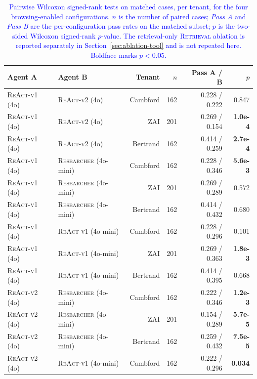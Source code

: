 \begin{table}[htbp]
\centering
\footnotesize
\caption{\textcolor{blue}{Pairwise Wilcoxon signed-rank tests on matched cases, per tenant, for the four browsing-enabled configurations. $n$ is the number of paired cases; \textit{Pass A} and \textit{Pass B} are the per-configuration pass rates on the matched subset; $p$ is the two-sided Wilcoxon signed-rank $p$-value. The retrieval-only \textsc{Retrieval} ablation is reported separately in Section~\ref{sec:ablation-tool} and is not repeated here. Boldface marks $p<0.05$.}}
\label{tab:wilcoxon_full}
\begin{tabular}{llrrrr}
\toprule
Agent A & Agent B & Tenant & $n$ & Pass A / B & $p$ \\
\midrule
\textsc{ReAct-v1} (4o) & \textsc{ReAct-v2} (4o)    & Cambford & 162 & 0.228 / 0.222 & 0.847 \\
\textsc{ReAct-v1} (4o) & \textsc{ReAct-v2} (4o)    & ZAI      & 201 & 0.269 / 0.154 & \textbf{1.0e-4} \\
\textsc{ReAct-v1} (4o) & \textsc{ReAct-v2} (4o)    & Bertrand & 162 & 0.414 / 0.259 & \textbf{2.7e-4} \\
\textsc{ReAct-v1} (4o) & \textsc{Researcher} (4o-mini)   & Cambford & 162 & 0.228 / 0.346 & \textbf{5.6e-3} \\
\textsc{ReAct-v1} (4o) & \textsc{Researcher} (4o-mini)   & ZAI      & 201 & 0.269 / 0.289 & 0.572 \\
\textsc{ReAct-v1} (4o) & \textsc{Researcher} (4o-mini)   & Bertrand & 162 & 0.414 / 0.432 & 0.680 \\
\textsc{ReAct-v1} (4o) & \textsc{ReAct-v1} (4o-mini)    & Cambford & 162 & 0.228 / 0.296 & 0.101 \\
\textsc{ReAct-v1} (4o) & \textsc{ReAct-v1} (4o-mini)    & ZAI      & 201 & 0.269 / 0.363 & \textbf{1.8e-3} \\
\textsc{ReAct-v1} (4o) & \textsc{ReAct-v1} (4o-mini)    & Bertrand & 162 & 0.414 / 0.395 & 0.668 \\
\textsc{ReAct-v2} (4o) & \textsc{Researcher} (4o-mini)   & Cambford & 162 & 0.222 / 0.346 & \textbf{1.2e-3} \\
\textsc{ReAct-v2} (4o) & \textsc{Researcher} (4o-mini)   & ZAI      & 201 & 0.154 / 0.289 & \textbf{5.7e-5} \\
\textsc{ReAct-v2} (4o) & \textsc{Researcher} (4o-mini)   & Bertrand & 162 & 0.259 / 0.432 & \textbf{7.5e-5} \\
\textsc{ReAct-v2} (4o) & \textsc{ReAct-v1} (4o-mini)    & Cambford & 162 & 0.222 / 0.296 & \textbf{0.034} \\

\end{tabular}
\end{table}
